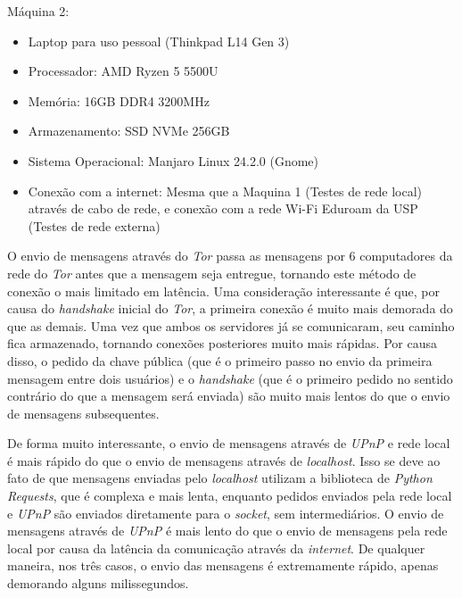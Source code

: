 Máquina 2:

\begin{tcolorbox}[colback=gray!10, colframe=gray, sharp corners=south]
\begin{itemize}
    \setlength\itemsep{0em}
    \setlength\leftmargini{2em}
    \item Laptop para uso pessoal (Thinkpad L14 Gen 3)
    \item Processador: AMD Ryzen 5 5500U
    \item Memória: 16GB DDR4 3200MHz
    \item Armazenamento: SSD NVMe 256GB
    \item Sistema Operacional: Manjaro Linux 24.2.0 (Gnome)
    \item Conexão com a internet: Mesma que a Maquina 1 (Testes de rede local) através de cabo de rede, e conexão com a rede Wi-Fi Eduroam da USP (Testes de rede externa)
\end{itemize}
\end{tcolorbox}

O envio de mensagens através do \textit{Tor} passa as mensagens por 6 computadores da rede do \textit{Tor} antes que a mensagem seja entregue, tornando este método de conexão o mais limitado em latência. Uma consideração interessante é que, por causa do \textit{handshake} inicial do \textit{Tor}, a primeira conexão é muito mais demorada do que as demais. Uma vez que ambos os servidores já se comunicaram, seu caminho fica armazenado, tornando conexões posteriores muito mais rápidas. Por causa disso, o pedido da chave pública (que é o primeiro passo no envio da primeira mensagem entre dois usuários) e o \textit{handshake} (que é o primeiro pedido no sentido contrário do que a mensagem será enviada) são muito mais lentos do que o envio de mensagens subsequentes.

De forma muito interessante, o envio de mensagens através de \textit{UPnP} e rede local é mais rápido do que o envio de mensagens através de \textit{localhost}. Isso se deve ao fato de que mensagens enviadas pelo \textit{localhost} utilizam a biblioteca de \textit{Python Requests}, que é complexa e mais lenta, enquanto pedidos enviados pela rede local e \textit{UPnP} são enviados diretamente para o \textit{socket}, sem intermediários. O envio de mensagens através de \textit{UPnP} é mais lento do que o envio de mensagens pela rede local por causa da latência da comunicação através da \textit{internet}. De qualquer maneira, nos três casos, o envio das mensagens é extremamente rápido, apenas demorando alguns milissegundos.

